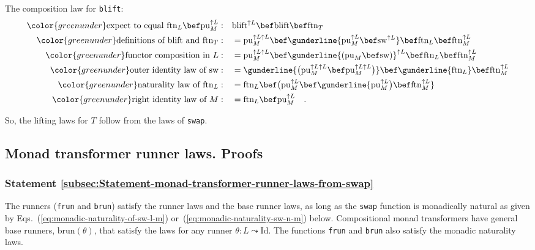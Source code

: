 The composition law for \lstinline!blift!:
\begin{align*}
{\color{greenunder}\text{expect to equal }\text{ftn}_{L}\bef\text{pu}_{M}^{\uparrow L}:}\quad & \text{blift}^{\uparrow L}\bef\text{blift}\bef\text{ftn}_{T}\\
{\color{greenunder}\text{definitions of }\text{blift}\text{ and }\text{ftn}_{T}:}\quad & =\text{pu}_{M}^{\uparrow L\uparrow L}\bef\gunderline{\text{pu}_{M}^{\uparrow L}\bef\text{sw}^{\uparrow L}}\bef\text{ftn}_{L}\bef\text{ftn}_{M}^{\uparrow L}\\
{\color{greenunder}\text{functor composition in }L:}\quad & =\text{pu}_{M}^{\uparrow L\uparrow L}\bef\gunderline{\left(\text{pu}_{M}\bef\text{sw}\right)}^{\uparrow L}\bef\text{ftn}_{L}\bef\text{ftn}_{M}^{\uparrow L}\\
{\color{greenunder}\text{outer identity law of }\text{sw}:}\quad & =\gunderline{\big(\text{pu}_{M}^{\uparrow L\uparrow L}\bef\text{pu}_{M}^{\uparrow L\uparrow L}\big)}\bef\gunderline{\text{ftn}_{L}}\bef\text{ftn}_{M}^{\uparrow L}\\
{\color{greenunder}\text{naturality law of }\text{ftn}_{L}:}\quad & =\text{ftn}_{L}\bef\big(\text{pu}_{M}^{\uparrow L}\bef\gunderline{\text{pu}_{M}^{\uparrow L}\big)\bef\text{ftn}_{M}^{\uparrow L}}\\
{\color{greenunder}\text{right identity law of }M:}\quad & =\text{ftn}_{L}\bef\text{pu}_{M}^{\uparrow L}\quad.
\end{align*}

So, the lifting laws for $T$ follow from the laws of \lstinline!swap!.

\subsection{Monad transformer runner laws. Proofs}

\subsubsection{Statement \label{subsec:Statement-monad-transformer-runner-laws-from-swap}\ref{subsec:Statement-monad-transformer-runner-laws-from-swap}}

The runners (\lstinline!frun! and \lstinline!brun!) satisfy the
runner laws and the base runner laws, as long as the \lstinline!swap!
function is monadically natural as given by Eqs.~(\ref{eq:monadic-naturality-of-sw-l-m})
or~(\ref{eq:monadic-naturality-sw-n-m}) below. Compositional monad
transformers have general base runners, $\text{brun}\left(\theta\right)$,
that satisfy the laws for any runner $\theta:L\leadsto\text{Id}$.
The functions \lstinline!frun! and \lstinline!brun! also satisfy
the monadic naturality laws.

